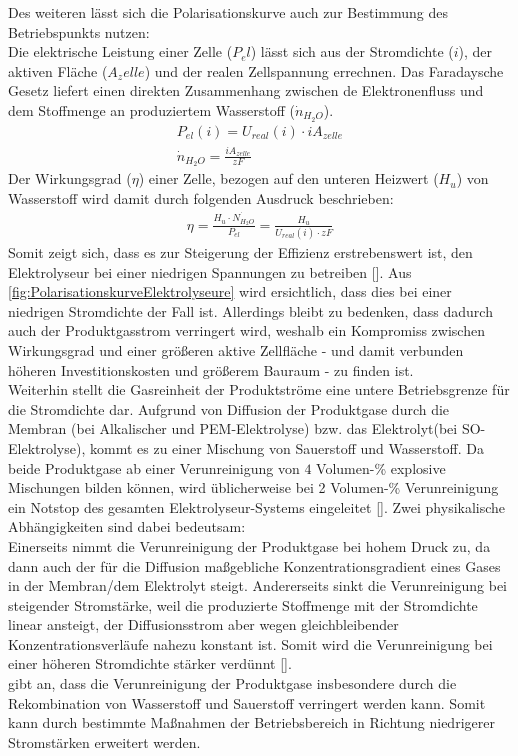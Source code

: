 Des weiteren lässt sich die Polarisationskurve auch zur Bestimmung des Betriebspunkts nutzen:\\
Die elektrische Leistung einer Zelle ($P_el$) lässt sich aus der Stromdichte ($i$), der aktiven Fläche ($A_zelle$) und der realen Zellspannung errechnen. Das Faradaysche Gesetz liefert einen direkten Zusammenhang zwischen de Elektronenfluss und dem Stoffmenge an produziertem Wasserstoff ($\dot{n}_{H_2O}$).
\begin{align}
	P_{el}(i) = U_{real}(i)\cdot i A_{zelle}\\
	\dot{n}_{H_2O} = \frac{i A_{zelle}}{zF}
\end{align}
Der Wirkungsgrad ($\eta$) einer Zelle, bezogen auf den unteren Heizwert ($H_u$) von Wasserstoff wird damit durch folgenden Ausdruck beschrieben:
\begin{align}
	\eta = \frac{H_u \cdot\dot{N_{H_2O}}}{P_{el}} = \frac{H_u}{U_{real}(i)\cdot{zF}}
\end{align}
Somit zeigt sich, dass es zur Steigerung der Effizienz erstrebenswert ist, den Elektrolyseur bei einer niedrigen Spannungen zu betreiben [\cite{A semiempirical study of the temperature dependence of the anode charge transfer coefficient of a 6 kW PEM electrolyzer}]. Aus \ref{fig:PolarisationskurveElektrolyseure} wird ersichtlich, dass dies bei einer niedrigen Stromdichte der Fall ist. Allerdings bleibt zu bedenken, dass dadurch auch der Produktgasstrom verringert wird, weshalb ein Kompromiss zwischen Wirkungsgrad und einer größeren aktive Zellfläche - und damit verbunden höheren Investitionskosten und größerem Bauraum - zu finden ist.\\
Weiterhin stellt die Gasreinheit der Produktströme eine untere Betriebsgrenze für die Stromdichte dar. Aufgrund von Diffusion der Produktgase durch die Membran (bei Alkalischer und PEM-Elektrolyse) bzw. das Elektrolyt(bei SO-Elektrolyse), kommt es zu einer Mischung von Sauerstoff und Wasserstoff. Da beide Produktgase ab einer Verunreinigung von $4$ Volumen-\% explosive Mischungen bilden können, wird üblicherweise bei 2 Volumen-\% Verunreinigung ein Notstop des gesamten Elektrolyseur-Systems eingeleitet [\cite{Alkaline Water Electrolysis Powered by Renewable Energy: A Review}]. Zwei physikalische  Abhängigkeiten sind dabei bedeutsam:\\ 
Einerseits nimmt die Verunreinigung der Produktgase bei hohem Druck zu, da dann auch der für die Diffusion maßgebliche Konzentrationsgradient eines Gases in der Membran/dem Elektrolyt steigt.
Andererseits sinkt die Verunreinigung bei steigender Stromstärke, weil die produzierte Stoffmenge mit der Stromdichte linear ansteigt, der Diffusionsstrom aber wegen gleichbleibender Konzentrationsverläufe  nahezu konstant ist. Somit wird die Verunreinigung bei einer höheren Stromdichte stärker verdünnt [\cite{Alkaline Water Electrolysis Powered by Renewable Energy: A Review}].\\
\cite{High-pressure PEM water electrolysis and corresponding safety issues} gibt an, dass die Verunreinigung der Produktgase insbesondere durch die Rekombination von Wasserstoff und Sauerstoff verringert werden kann.  Somit kann durch bestimmte Maßnahmen der Betriebsbereich in Richtung niedrigerer Stromstärken erweitert werden.

